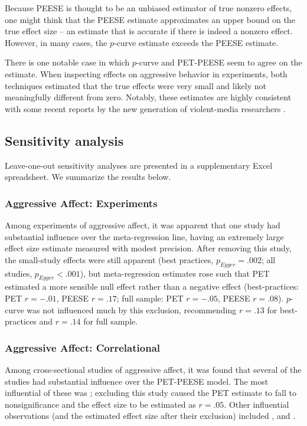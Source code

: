 \documentclass[man]{apa6}
\begin{document}
Because PEESE is thought to be an unbiased estimator of true nonzero effects, one might think that the PEESE estimate approximates an upper bound on the true effect size -- an estimate that is accurate if there is indeed a nonzero effect. However, in many cases, the $p$-curve estimate exceeds the PEESE estimate. 

There is one notable case in which $p$-curve and PET-PEESE seem to agree on the estimate. When inspecting effects on aggressive behavior in experiments, both techniques estimated that the true effects were very small and likely not meaningfully different from zero. Notably, these estimates are highly consistent with some recent reports by the new generation of violent-media researchers \citep{Engelhardt:etal:2015,Przybylski:etal:2014}.

\subsection{Sensitivity analysis}
Leave-one-out sensitivity analyses are presented in a supplementary Excel spreadsheet. We summarize the results below.

\subsubsection{Aggressive Affect: Experiments} Among experiments of aggressive affect, it was apparent that one study \citep{Ballard:Weist:1996} had substantial influence over the meta-regression line, having an extremely large effect size estimate measured with modest precision. After removing this study, the small-study effects were still apparent (best practices, $p_{Egger} = .002$; all studies, $p_{Egger} < .001$), but meta-regression estimates rose such that PET estimated a more sensible null effect rather than a negative effect (best-practices: PET $r = -.01$, PEESE $r = .17$; full sample: PET $r = -.05$, PEESE $r = .08$). $p$-curve was not influenced much by this exclusion, recommending $r = .13$ for best-practices and $r = .14$ for full sample. 

\subsubsection{Aggressive Affect: Correlational} Among cross-sectional studies of aggressive affect, it was found that several of the studies had substantial influence over the PET-PEESE model. The most influential of these was \citet{Uozumi:2006}; excluding this study caused the PET estimate to fall to nonsignificance and the effect size to be estimated as $r = .05$. Other influential observations (and the estimated effect size after their exclusion) included \citet[study 2, $r = .13$]{Matsuzaki:etal:2004}, and \citet[$r = .16$]{Yukawa:Sakamoto:2001}.
\end{document}
